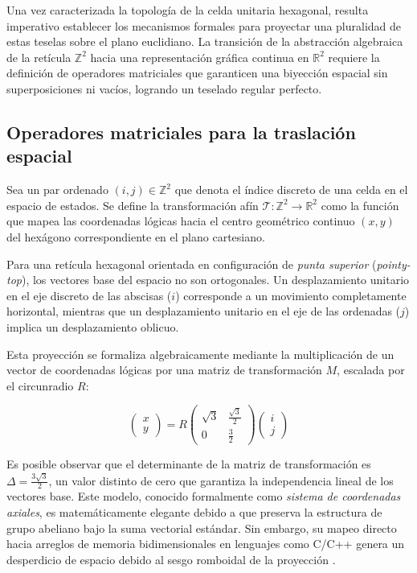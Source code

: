 Una vez caracterizada la topología de la celda unitaria hexagonal, resulta imperativo establecer los mecanismos formales para proyectar una pluralidad de estas teselas sobre el plano euclidiano. La transición de la abstracción algebraica de la retícula $\mathbb{Z}^2$ hacia una representación gráfica continua en $\mathbb{R}^2$ requiere la definición de operadores matriciales que garanticen una biyección espacial sin superposiciones ni vacíos, logrando un teselado regular perfecto.

\subsection{Operadores matriciales para la traslación espacial}

Sea un par ordenado $(i,j) \in \mathbb{Z}^2$ que denota el índice discreto de una celda en el espacio de estados. Se define la transformación afín $\mathcal{T}: \mathbb{Z}^2 \to \mathbb{R}^2$ como la función que mapea las coordenadas lógicas hacia el centro geométrico continuo $(x,y)$ del hexágono correspondiente en el plano cartesiano.

Para una retícula hexagonal orientada en configuración de \textit{punta superior} (\textit{pointy-top}), los vectores base del espacio no son ortogonales. Un desplazamiento unitario en el eje discreto de las abscisas ($i$) corresponde a un movimiento completamente horizontal, mientras que un desplazamiento unitario en el eje de las ordenadas ($j$) implica un desplazamiento oblicuo.

Esta proyección se formaliza algebraicamente mediante la multiplicación de un vector de coordenadas lógicas por una matriz de transformación $M$, escalada por el circunradio $R$:

\begin{equation}
    \begin{pmatrix} x \\ y \end{pmatrix} = 
    R \begin{pmatrix} 
        \sqrt{3} & \frac{\sqrt{3}}{2} \\ 
        0 & \frac{3}{2} 
    \end{pmatrix} 
    \begin{pmatrix} i \\ j \end{pmatrix}
\end{equation}

Es posible observar que el determinante de la matriz de transformación es $\Delta = \frac{3\sqrt{3}}{2}$, un valor distinto de cero que garantiza la independencia lineal de los vectores base. Este modelo, conocido formalmente como \textit{sistema de coordenadas axiales}, es matemáticamente elegante debido a que preserva la estructura de grupo abeliano bajo la suma vectorial estándar. Sin embargo, su mapeo directo hacia arreglos de memoria bidimensionales en lenguajes como C/C++ genera un desperdicio de espacio debido al sesgo romboidal de la proyección \cite{Basurto2009}.

